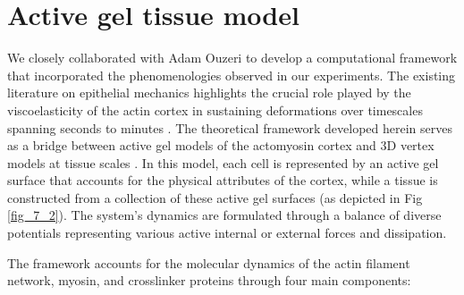 \hypertarget{active-gel-tissue-model}{%
	\section{Active gel tissue model}\label{active-gel-tissue-model}}


We closely collaborated with Adam Ouzeri to develop a computational framework that incorporated the phenomenologies observed in our experiments. The existing literature on epithelial mechanics highlights the crucial role played by the viscoelasticity of the actin cortex in sustaining deformations over timescales spanning seconds to minutes \cite{kelkar2020,clement2017,khalilgharibi2019}. The theoretical framework developed herein serves as a bridge between active gel models of the actomyosin cortex and 3D vertex models at tissue scales \cite{ouzeri2023}. In this model, each cell is represented by an active gel surface that accounts for the physical attributes of the cortex, while a tissue is constructed from a collection of these active gel surfaces (as depicted in Fig \ref{fig_7_2}). The system's dynamics are formulated through a balance of diverse potentials representing various active internal or external forces and dissipation.

The framework accounts for the molecular dynamics of the actin filament network, myosin, and crosslinker proteins through four main components:

